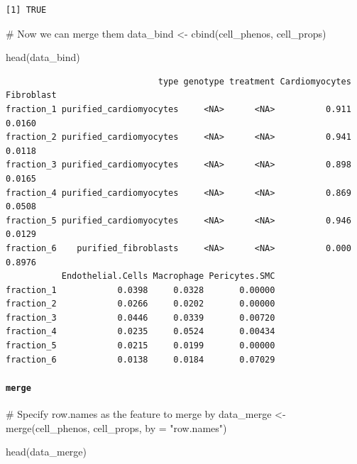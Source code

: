 \documentclass[
  letterpaper,
  DIV=11,
  numbers=noendperiod]{scrreprt}
\let\oldparagraph\paragraph
\renewcommand{\paragraph}[1]{\oldparagraph{#1}\mbox{}}
\newenvironment{Shaded}{\begin{snugshade}}{\end{snugshade}}
\newcommand{\AttributeTok}[1]{\textcolor[rgb]{0.40,0.45,0.13}{#1}}
\newcommand{\CommentTok}[1]{\textcolor[rgb]{0.37,0.37,0.37}{#1}}
\newcommand{\FunctionTok}[1]{\textcolor[rgb]{0.28,0.35,0.67}{#1}}
\newcommand{\NormalTok}[1]{\textcolor[rgb]{0.00,0.23,0.31}{#1}}
\newcommand{\OtherTok}[1]{\textcolor[rgb]{0.00,0.23,0.31}{#1}}
\newcommand{\StringTok}[1]{\textcolor[rgb]{0.13,0.47,0.30}{#1}}
\begin{document}
\begin{verbatim}
[1] TRUE
\end{verbatim}

\begin{Shaded}
\begin{Highlighting}[]
\CommentTok{\# Now we can merge them }
\NormalTok{data\_bind }\OtherTok{\textless{}{-}} \FunctionTok{cbind}\NormalTok{(cell\_phenos, cell\_props)}

\FunctionTok{head}\NormalTok{(data\_bind)}
\end{Highlighting}
\end{Shaded}

\begin{verbatim}
                              type genotype treatment Cardiomyocytes Fibroblast
fraction_1 purified_cardiomyocytes     <NA>      <NA>          0.911     0.0160
fraction_2 purified_cardiomyocytes     <NA>      <NA>          0.941     0.0118
fraction_3 purified_cardiomyocytes     <NA>      <NA>          0.898     0.0165
fraction_4 purified_cardiomyocytes     <NA>      <NA>          0.869     0.0508
fraction_5 purified_cardiomyocytes     <NA>      <NA>          0.946     0.0129
fraction_6    purified_fibroblasts     <NA>      <NA>          0.000     0.8976
           Endothelial.Cells Macrophage Pericytes.SMC
fraction_1            0.0398     0.0328       0.00000
fraction_2            0.0266     0.0202       0.00000
fraction_3            0.0446     0.0339       0.00720
fraction_4            0.0235     0.0524       0.00434
fraction_5            0.0215     0.0199       0.00000
fraction_6            0.0138     0.0184       0.07029
\end{verbatim}

\paragraph{\texorpdfstring{\texttt{merge}}{merge}}\label{merge}

\begin{Shaded}
\begin{Highlighting}[]
\CommentTok{\# Specify row.names as the feature to merge by}
\NormalTok{data\_merge }\OtherTok{\textless{}{-}} \FunctionTok{merge}\NormalTok{(cell\_phenos, cell\_props, }\AttributeTok{by =} \StringTok{"row.names"}\NormalTok{)}

\FunctionTok{head}\NormalTok{(data\_merge)}
\end{Highlighting}
\end{Shaded}
\end{document}
